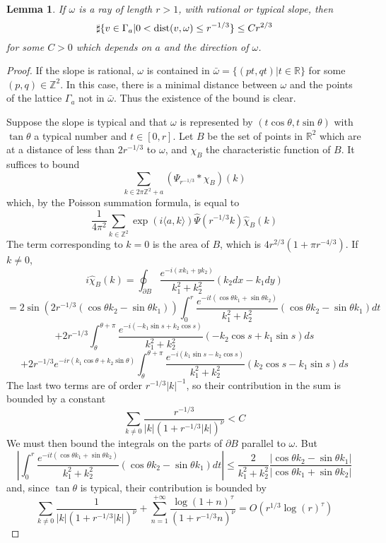 \documentclass[12pt]{amsart}
\numberwithin{equation}{subsection}
\theoremstyle{definition}
\theoremstyle{plain}
\newtheorem{lemma}[equation]{Lemma}
\begin{document}
\begin{lemma}
\label{lme}
If $\omega$ is a ray of length $r>1$, with rational or typical slope, then
\[
\sharp \{ v \in \Gamma_a | 0 < {\rm{dist}}(v,\omega) \leq r^{-1/3} \} \leq C r^{2/3}
\]
for some $C > 0$ which depends on $a$ and the direction of $\omega$.
\end{lemma}
\begin{proof}
If the slope is rational, $\omega$ is contained in $\bar{\omega}=\{(pt,qt)| t \in \mathbb{R}\}$ for some
$(p,q) \in \mathbb{Z}^2$.
In this case, there is a minimal distance between $\omega$ and the points
of the lattice $\Gamma_a$ not in $\bar{\omega}$.
Thus the existence of the bound is clear.

Suppose the slope is typical and that $\omega$ is represented by $(t \cos \theta,t \sin \theta)$ with $\tan \theta$ a typical number
and $t \in [0, r]$.
Let $B$ be the set of points in $\mathbb{R}^2$ which are at a distance of less than $2 r^{-1/3}$ to $\omega$,
and $\chi_B$ the characteristic function of $B$. It suffices to bound
\[
\sum_{k \in 2 \pi \mathbb Z^2 +a} (\Psi_{r^{-1/3}} \ast \chi_{B}) (k)
\]
which, by the Poisson summation formula, is equal to
\[
\frac{1}{4 \pi^2} \sum_{k \in \mathbb Z^2} \exp(i\langle a,k \rangle) \hat{\Psi}(r^{-1/3}k) \hat{\chi}_{B}(k)
\]
The term corresponding to $k=0$ is the area of $B$, which is $4 r^{2/3}(1+\pi r^{-4/3})$.
If $k \neq 0$,
\[
i\hat{\chi}_{B}(k) = \oint_{\partial B} \frac{e^{-i(x k_1+y k_2)}}{k_1^2+k_2^2} (k_2 dx - k_1 dy)
\]
\[
=
2 \sin \left(2 r^{-1/3} (\cos \theta k_2 - \sin \theta k_1) \right)
\int_{0}^{r} \frac{e^{-i t ( \cos \theta k_1+ \sin \theta  k_2)}}{k_1^2+k_2^2} ( \cos \theta k_2- \sin \theta k_1) dt
\]
\[
+ 2 r^{-1/3}\int_\theta^{\theta + \pi} \frac{e^{-i(-k_1 \sin s + k_2 \cos s)}}{k_1^2+k_2^2} (- k_2 \cos s  +  k_1 \sin s) ds
\]
\[
+ 2 r^{-1/3} e^{-ir (k_1 \cos \theta + k_2 \sin \theta)} \int_\theta^{\theta + \pi}
\frac{e^{-i(k_1 \sin s - k_2 \cos s)}}{k_1^2+k_2^2} (k_2 \cos s - k_1 \sin s) ds
\]
The last two terms are of order $r^{-1/3}|k|^{-1}$, so their contribution in the sum is bounded by a constant
\[
\sum_{k \neq 0} \frac{r^{-1/3}}{|k|(1+r^{-1/3}|k|)^\nu} < C
\]
We must then bound the integrals on the parts of $\partial B$ parallel to $\omega$.
But
\[
\left| \int_{0}^{r} \frac{e^{-i t ( \cos \theta k_1+ \sin \theta  k_2)}}{k_1^2+k_2^2} ( \cos \theta k_2- \sin \theta k_1) dt \right|
\leq \frac{2}{k_1^2+k_2^2} \frac{|\cos \theta k_2- \sin \theta k_1|}{|\cos \theta k_1+ \sin \theta  k_2|}
\]
and, since $\tan \theta$ is typical, their contribution is bounded by
\[
\sum_{k \neq 0} \frac{1}{|k|(1+r^{-1/3}|k|)^\nu} + \sum_{n=1}^{+\infty} \frac{\log(1+n)^{\tau}}{(1+r^{-1/3}n)^\nu}
=O(r^{1/3}\log(r)^{\tau})
\]
\end{proof}
\end{document}
